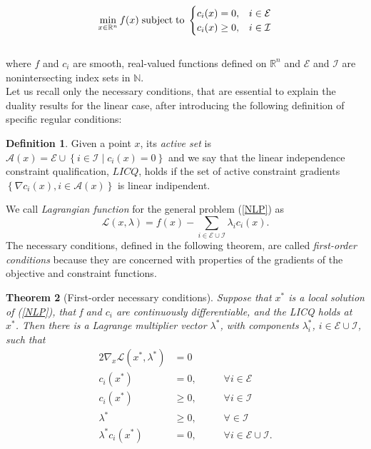 \documentclass[a4paper,10 pt,titlepage,twoside]{book}
\theoremstyle{plain}
\newtheorem{thm}{Theorem}[chapter]
\theoremstyle{definition}
\newtheorem{defn}[thm]{Definition}
\theoremstyle{remark}
\begin{document}
\begin{equation}\label{NLP}
\min\limits_{x\in\mathbb{R}^{n}} f(x)\text{\;subject\;to\;}\begin{cases} c_{i}(x) = 0, &i \in \mathcal{E}\\ c_{i}(x)\geq 0, &i\in \mathcal{I}\end{cases}
\end{equation}
\\
where $f$ and $c_{i}$ are smooth, real-valued functions defined on $\mathbb{R}^{n}$ and $\mathcal{E}$ and $\mathcal{I}$ are nonintersecting index sets in $\mathbb{N}$.\\Let us recall only the necessary conditions, that are essential to explain the duality results for the linear case, after introducing the following definition of specific regular conditions:
\begin{defn}
	Given a point $x$, its \textit{active set} is $\mathcal{A}(x)= \mathcal{E}\cup\left\lbrace i\in\mathcal{I}\;|\;c_{i}(x) =0\right\rbrace$ and we say that the linear independence constraint qualification, $LICQ$, holds if the set of active constraint gradients $\left\lbrace \nabla c_{i}(x),i\in\mathcal{A}(x)\right\rbrace$ is linear indipendent.
\end{defn}
We call \textit{Lagrangian function} for the general problem (\ref{NLP}) as 
\begin{equation*}
\mathcal{L}\left(x,\lambda\right)=f(x)-\sum_{i\in\mathcal{E}\cup\mathcal{I}}\lambda_{i}c_{i}(x).
\end{equation*}
The necessary conditions, defined in the following theorem, are called \textit{first-order conditions} because they are concerned with properties of the gradients of the objective and constraint functions.

\begin{thm}[First-order necessary conditions]\label{thm:kkt}
Suppose that $x^{*}$ is a local solution of (\ref{NLP}), that f and $c_{i}$ are continuously differentiable, and the LICQ holds at $x^{*}$. Then there is a Lagrange multiplier vector $\lambda^{*}$, with components $\lambda^{*}_{i}$, $i \in \mathcal{E}\cup\mathcal{I}$, such that 
\begin{alignat*}{2}
\nabla_{x}\mathcal{L}(x^{*},\lambda^{*})&=0&&\\
c_{i}(x^{*})&=0, &&\;\;\;\;\forall i\in\mathcal{E}\\
c_{i}(x^{*})&\geq 0, &&\;\;\;\;\forall i\in\mathcal{I}\\
\lambda^{*} &\geq 0, &&\;\;\;\;\forall \in\mathcal{I}\\
\lambda^{*}c_{i}(x^{*})&= 0,&&\;\;\;\;\forall i\in\mathcal{E}\cup\mathcal{I}.\label{CompCon}\\
\end{alignat*} 
\end{thm}
\end{document}
